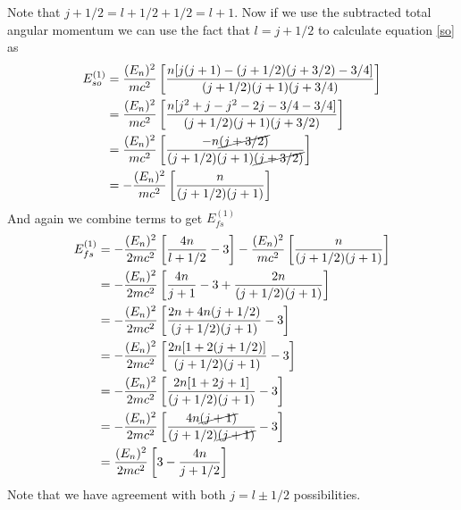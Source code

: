 \documentclass[11pt]{article}
\numberwithin{equation}{section}
\begin{document}
Note that $j+1/2 = l+1/2+1/2 = l+1$. Now if we use the subtracted total angular momentum we can use the fact that $l = j+1/2$ to calculate equation \ref{so} as
\begin{align*}
E^{(1)}_{so} &= \frac{(E_n)^2}{mc^2}\left[\frac{n[j(j+1)-(j+1/2)(j+3/2)-3/4]}{(j+1/2)(j+1)(j+3/4)}\right]\\
&= \frac{(E_n)^2}{mc^2}\left[\frac{n[j^2 + j - j^2 - 2j - 3/4 - 3/4]}{(j+1/2)(j+1)(j+3/2)}\right]\\
&= \frac{(E_n)^2}{mc^2}\left[\frac{-n\cancel{(j + 3/2)}}{(j+1/2)(j+1)\cancel{(j+3/2)}}\right]\\
&= -\frac{(E_n)^2}{mc^2}\left[\frac{n}{(j+1/2)(j+1)}\right]
\end{align*}
And again we combine terms to get $E_{fs}^{(1)}$
\begin{align*}
E_{fs}^{(1)} &= -\frac{(E_n)^2}{2mc^2}\left[\frac{4n}{l+1/2}-3\right] -\frac{(E_n)^2}{mc^2}\left[\frac{n}{(j+1/2)(j+1)}\right]\\
&= -\frac{(E_n)^2}{2mc^2}\left[\frac{4n}{j+1}-3 + \frac{2n}{(j+1/2)(j+1)}\right]\\
&= -\frac{(E_n)^2}{2mc^2}\left[\frac{2n + 4n(j+1/2)}{(j+1/2)(j+1)} - 3\right]\\
&= -\frac{(E_n)^2}{2mc^2}\left[\frac{2n[1 + 2(j+1/2)]}{(j+1/2)(j+1)} - 3\right]\\
&= -\frac{(E_n)^2}{2mc^2}\left[\frac{2n[1 + 2j+1]}{(j+1/2)(j+1)} - 3\right]\\
&= -\frac{(E_n)^2}{2mc^2}\left[\frac{4n\cancel{(j+1)}}{(j+1/2)\cancel{(j+1)}} - 3\right]\\
&= \frac{(E_n)^2}{2mc^2}\left[3-\frac{4n}{j+1/2}\right]\\
\end{align*}
Note that we have agreement with both $j=l\pm1/2$ possibilities.
\end{document}
